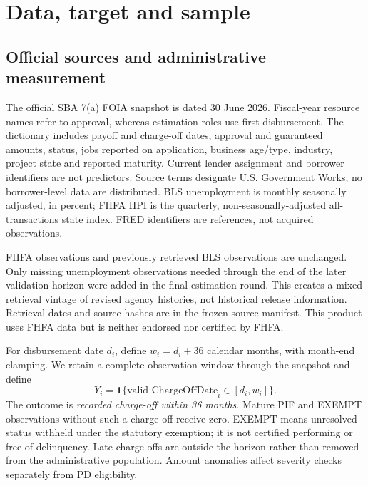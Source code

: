\section{Data, target and sample}
\subsection{Official sources and administrative measurement}
The official SBA 7(a) FOIA snapshot is dated 30 June 2026. Fiscal-year resource names refer to approval, whereas estimation roles use first disbursement. The dictionary includes payoff and charge-off dates, approval and guaranteed amounts, status, jobs reported on application, business age/type, industry, project state and reported maturity. Current lender assignment and borrower identifiers are not predictors. Source terms designate U.S. Government Works; no borrower-level data are distributed. BLS unemployment is monthly seasonally adjusted, in percent; FHFA HPI is the quarterly, non-seasonally-adjusted all-transactions state index. FRED identifiers are references, not acquired observations.

FHFA observations and previously retrieved BLS observations are unchanged. Only missing unemployment observations needed through the end of the later validation horizon were added in the final estimation round. This creates a mixed retrieval vintage of revised agency histories, not historical release information. Retrieval dates and source hashes are in the frozen source manifest. This product uses FHFA data but is neither endorsed nor certified by FHFA.

For disbursement date $d_i$, define $w_i=d_i+36$ calendar months, with month-end clamping. We retain a complete observation window through the snapshot and define
\[Y_i=\mathbf{1}\{\text{valid ChargeOffDate}_i\in[d_i,w_i]\}.\]
The outcome is \emph{recorded charge-off within 36 months}. Mature PIF and EXEMPT observations without such a charge-off receive zero. EXEMPT means unresolved status withheld under the statutory exemption; it is not certified performing or free of delinquency. Late charge-offs are outside the horizon rather than removed from the administrative population. Amount anomalies affect severity checks separately from PD eligibility.


